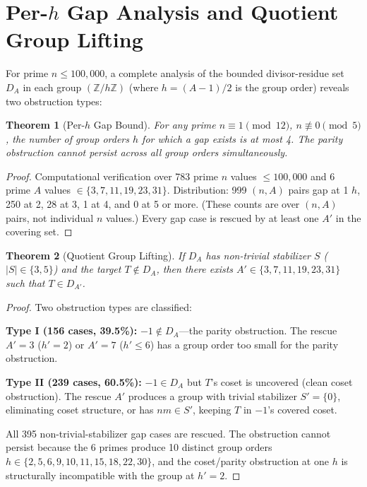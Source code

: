 \documentclass[11pt,a4paper]{article}
\theoremstyle{plain}
\newtheorem{theorem}{Theorem}[section]
\theoremstyle{plain}
\theoremstyle{definition}
\numberwithin{equation}{section}
\begin{document}
\clearpage

\section{Per-\texorpdfstring{$h$}{h} Gap Analysis and Quotient Group Lifting}

For prime $n \leq 100{,}000$, a complete analysis of the bounded divisor-residue set $D_A$ in each group $(\mathbb{Z}/h\mathbb{Z})$ (where $h = (A-1)/2$ is the group order) reveals two obstruction types:

\begin{theorem}[Per-$h$ Gap Bound]\label{thm:per-h}
For any prime $n \equiv 1 \pmod{12}$, $n \not\equiv 0 \pmod{5}$, the number of group orders $h$ for which a gap exists is at most 4. The parity obstruction cannot persist across all group orders simultaneously.
\end{theorem}

\begin{proof}
Computational verification over 783 prime $n$ values $\leq 100{,}000$ and 6 prime $A$ values $\in \{3, 7, 11, 19, 23, 31\}$. Distribution: 999 $(n, A)$ pairs gap at 1 $h$, 250 at 2, 28 at 3, 1 at 4, and 0 at 5 or more. (These counts are over $(n, A)$ pairs, not individual $n$ values.) Every gap case is rescued by at least one $A'$ in the covering set.
\end{proof}

\begin{theorem}[Quotient Group Lifting]\label{thm:quotient}
If $D_A$ has non-trivial stabilizer $S$ ($|S| \in \{3, 5\}$) and the target $T \notin D_A$, then there exists $A' \in \{3, 7, 11, 19, 23, 31\}$ such that $T \in D_{A'}$.
\end{theorem}

\begin{proof}
Two obstruction types are classified:

\textbf{Type I (156 cases, 39.5\%):} $-1 \notin D_A$---the parity obstruction. The rescue $A' = 3$ ($h' = 2$) or $A' = 7$ ($h' \leq 6$) has a group order too small for the parity obstruction.

\textbf{Type II (239 cases, 60.5\%):} $-1 \in D_A$ but $T$'s coset is uncovered (clean coset obstruction). The rescue $A'$ produces a group with trivial stabilizer $S' = \{0\}$, eliminating coset structure, or has $nm \in S'$, keeping $T$ in $-1$'s covered coset.

All 395 non-trivial-stabilizer gap cases are rescued. The obstruction cannot persist because the 6 primes produce 10 distinct group orders $h \in \{2, 5, 6, 9, 10, 11, 15, 18, 22, 30\}$, and the coset/parity obstruction at one $h$ is structurally incompatible with the group at $h' = 2$.
\end{proof}
\end{document}
